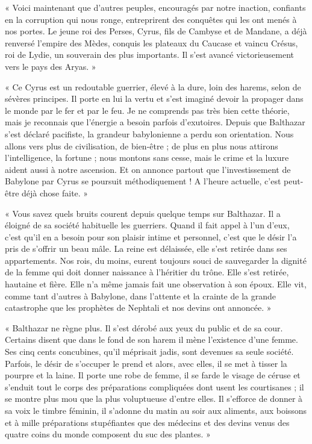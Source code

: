 \documentclass[a4paper, 11pt, oneside, polutonikogreek, french]{article}
\begin{document}
« Voici maintenant que d'autres peuples, encouragés par notre inaction, confiants en la corruption qui nous ronge, entreprirent des conquêtes qui les ont menés à nos portes. Le jeune roi des Perses, Cyrus, fils de Cambyse et de Mandane, a déjà renversé l'empire des Mèdes, conquis les plateaux du Caucase et vaincu Crésus, roi de Lydie, un souverain des plus importants. Il s'est avancé victorieusement vers le pays des Aryas. »

« Ce Cyrus est un redoutable guerrier, élevé à la dure, loin des harems, selon de sévères principes. Il porte en lui la vertu et s'est imaginé devoir la propager dans le monde par le fer et par le feu. Je ne comprends pas très bien cette théorie, mais je reconnais que l'énergie a besoin parfois d'exutoires. Depuis que Balthazar s'est déclaré pacifiste, la grandeur babylonienne a perdu son orientation. Nous allons vers plus de civilisation, de bien-être ; de plus en plus nous attirons l'intelligence, la fortune ; nous montons sans cesse, mais le crime et la luxure aident aussi à notre ascension. Et on annonce partout que l'investissement de Babylone par Cyrus se poursuit méthodiquement ! A l'heure actuelle, c'est peut-être déjà chose faite. »

\bigskip
\centerline{\EightStarTaper}
\centerline{\EightStarTaper\EightStarTaper}
\bigskip

« Vous savez quels bruits courent depuis quelque temps sur Balthazar. Il a éloigné de sa société habituelle les guerriers. Quand il fait appel à l'un d'eux, c'est qu'il en a besoin pour son plaisir intime et personnel, c'est que le désir l'a pris de s'offrir un beau mâle. La reine est délaissée, elle s'est retirée dans ses appartements. Nos rois, du moins, eurent toujours souci de sauvegarder la dignité de la femme qui doit donner naissance à l'héritier du trône. Elle s'est retirée, hautaine et fière. Elle n'a même jamais fait une observation à son époux. Elle vit, comme tant d'autres à Babylone, dans l'attente et la crainte de la grande catastrophe que les prophètes de Nephtali et nos devins ont annoncée. »

« Balthazar ne règne plus. Il s'est dérobé aux yeux du public et de sa cour. Certains disent que dans le fond de son harem il mène l'existence d'une femme. Ses cinq cents concubines, qu'il méprisait jadis, sont devenues sa seule société. Parfois, le désir de s'occuper le prend et alors, avec elles, il se met à tisser la pourpre et la laine. Il porte une robe de femme, il se farde le visage de céruse et s'enduit tout le corps des préparations compliquées dont usent les courtisanes ; il se montre plus mou que la plus voluptueuse d'entre elles. Il s'efforce de donner à sa voix le timbre féminin, il s'adonne du matin au soir aux aliments, aux boissons et à mille préparations stupéfiantes que des médecins et des devins venus des quatre coins du monde composent du suc des plantes. »
\end{document}
